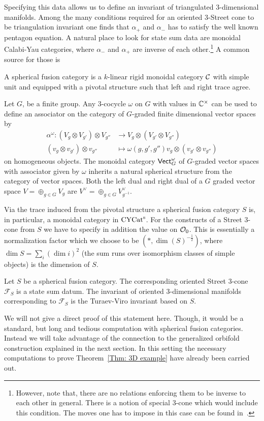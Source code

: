 Specifying this data allows us to define an invariant of triangulated 3-dimensional manifolds. Among the many conditions required for an oriented 3-Street cone to be triangulation invariant one finds that $\alpha_+$ and $\alpha_-$ has to satisfy the well known pentagon equation. A natural place to look for state sum data are monoidal Calabi-Yau categories, where $\alpha_-$ and $\alpha_+$ are inverse of each other.\footnote{However, note that, there are no relations enforcing them to be inverse to each other in general. There is a notion of special 3-cone which would include this condition. The moves one has to impose in this case can be found in~\cite[Section 3.4] {carqueville2016orbifoldcompletion}.}   
A common source for those is 
\begin{definition}
A spherical fusion category is a $k$-linear rigid monoidal category $\mathcal{C}$ with simple unit and equipped with a pivotal structure such that left and right trace agree.  
\end{definition}

\begin{example}
\label{ex:3dDW}
Let $G$, be a finite group. Any 3-cocycle $\omega$ on $G$ with values in $\mathbb{C}^\times$ can be used to define an associator on the category of $G$-graded finite dimensional vector spaces by  
\begin{align*}
\alpha^\omega \colon (V_g\otimes V_{g'}) \otimes V_{g''} & \longrightarrow V_g\otimes ( V_{g'} \otimes V_{g''}) \\
(v_g\otimes v_{g'})\otimes v_{g''} & \longmapsto  \omega(g,g',g'') v_g\otimes (v_{g'}\otimes v_{g''})
\end{align*}
on homogeneous objects. The monoidal category $\mathsf{Vect}_G^\omega$ of $G$-graded vector spaces with associator given by $\omega$ inherits a natural spherical structure from the category of vector spaces. Both the left dual and right dual of a $G$ graded vector space $V=\oplus_{g\in G} V_g$ are $V^\vee = \oplus_{g\in G} V_{g^{-1}}^\vee $.  
\end{example}
Via the trace induced from the pivotal structure a spherical fusion category $S$ is, in particular, a monoidal category in $\operatorname{\mathrm{CYCat}^s}$. For the constructs of a Street 3-cone from $S$ we have to specify in addition the value on $\mathcal{O}_0$. This is essentially a normalization factor which we choose to be $(*,\dim (S)^{-\tfrac{1}{2}})$, where $\dim S = \sum_i (\dim i)^2$ (the sum runs over isomorphism classes of simple objects) is the dimension of $S$.  
\begin{theorem}\label{Thm: 3D example}
Let $S$ be a spherical fusion category. The corresponding oriented Street 3-cone $\mathcal{F}_S$ is a state sum datum. The invariant of oriented 3-dimensional manifolds corresponding to $\mathcal{F}_S$ is the Turaev-Viro invariant based on $S$.  
\end{theorem}
We will not give a direct proof of this statement here. Though, it would be a standard, but long and tedious computation with spherical fusion categories. Instead we will take advantage of the connection to the generalized orbifold construction explained in the next section. In this setting the necessary computations to prove Theorem~\ref{Thm: 3D example} have already been carried out. 